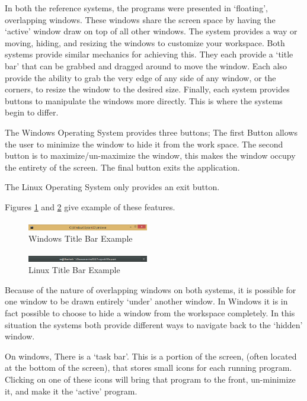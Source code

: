 \documentclass[a4paper]{report}
\begin{document}
In both the reference systems, the programs were presented in `floating', overlapping windows. These windows share the screen space by having the `active' window draw on top of all other windows. The system provides a way or moving, hiding, and resizing the windows to customize your workspace. Both systems provide similar mechanics for achieving this. They each provide a `title bar' that can be grabbed and dragged around to move the window. Each also provide the ability to grab the very edge of any side of any window, or the corners, to resize the window to the desired size. Finally, each system provides buttons to manipulate the windows more directly. This is where the systems begin to differ.

The Windows Operating System provides three buttons; The first Button allows the user to minimize the window to hide it from the work space. The second button is to maximize/un-maximize the window, this makes the window occupy the entirety of the screen. The final button exits the application.

The Linux Operating System only provides an exit button.

Figures \ref{fig:WinTitleBarScreen} and \ref{fig:LinTitleBarScreen} give example of these features.

\begin{figure}[ht]
\centering
\includegraphics[width=200px]{images/Windows_title_bar_screenshot}
\caption{Windows Title Bar Example}
\label{fig:WinTitleBarScreen}
\end{figure}

\begin{figure}[ht]
\centering
\includegraphics[width=200px]{images/Linux_title_bar_screenshot}
\caption{Linux Title Bar Example}
\label{fig:LinTitleBarScreen}
\end{figure}

Because of the nature of overlapping windows on both systems, it is possible for one window to be drawn entirely `under' another window. In Windows it is in fact possible to choose to hide a window from the workspace completely. In this situation the systems both provide different ways to navigate back to the `hidden' window.

On windows, There is a `task bar'. This is a portion of the screen, (often located at the bottom of the screen), that stores small icons for each running program. Clicking on one of these icons will bring that program to the front, un-minimize it, and make it the `active' program.
\end{document}
